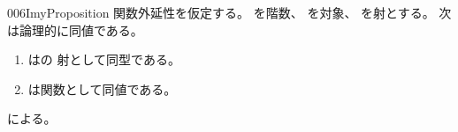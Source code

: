 \documentclass[index]{subfiles}
\begin{document}
\begin{myBlock}{006I}{myProposition}
  関数外延性を仮定する。
  を階数、
  を対象、
  を射とする。
  次は論理的に同値である。
  \begin{enumerate}
  \item \label{006I:0000} はの
    射として同型である。
  \item \label{006I:0001} は関数として同値である。
  \end{enumerate}
\end{myBlock}
\begin{myProof}
  による。
\end{myProof}
\end{document}
